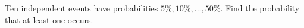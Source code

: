 Ten independent events have probabilities $5\%,10\%,\ldots,50\%$. Find the probability that at least one occurs.

